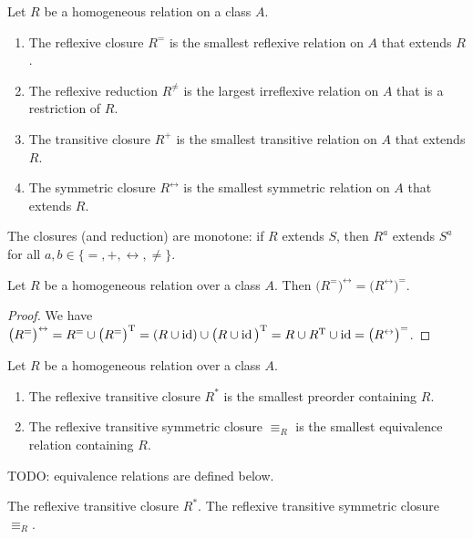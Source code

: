 \begin{lemma}
Let $R$ be a homogeneous relation on a class $A$.
\begin{enumerate}
\item The reflexive closure $R^=$ is the smallest reflexive relation on $A$ that extends $R$.
\item The reflexive reduction $R^{\neq}$ is the largest irreflexive relation on $A$ that is a restriction of $R$.
\item The transitive closure $R^{+}$ is the smallest transitive relation on $A$ that extends $R$.
\item The symmetric closure $R^{\leftrightarrow}$ is the smallest symmetric relation on $A$ that extends $R$.
\end{enumerate}
\end{lemma}

\begin{lemma}
The closures (and reduction) are monotone: if $R$ extends $S$, then $R^a$ extends $S^a$ for all $a,b\in\{=,+,\leftrightarrow,\neq\}$.
\end{lemma}

\begin{lemma}
Let $R$ be a homogeneous relation over a class $A$. Then $\big(R^=\big)^\leftrightarrow = \big(R^\leftrightarrow\big)^=$.
\end{lemma}
\begin{proof}
We have $\big(R^=\big)^\leftrightarrow = R^=\cup \big(R^=\big)^{\mathrm{T}} = (R\cup \operatorname{id})\cup \big(R \cup \operatorname{id}\big)^{\mathrm{T}} = R\cup R^{\mathrm{T}} \cup \operatorname{id} = \big(R^\leftrightarrow\big)^=$.
\end{proof}

\begin{lemma}
Let $R$ be a homogeneous relation over a class $A$.
\begin{enumerate}
\item The reflexive transitive closure $R^*$ is the smallest preorder containing $R$.
\item The reflexive transitive symmetric closure $\equiv_R$ is the smallest equivalence relation containing $R$.
\end{enumerate}
\end{lemma}
TODO: equivalence relations are defined below.

\begin{definition}
The reflexive transitive closure $R^*$. The reflexive transitive symmetric closure $\equiv_R$.
\end{definition}

